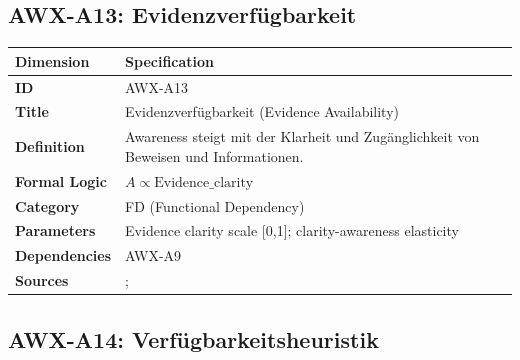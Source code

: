 
\subsection{AWX-A13: Evidenzverfügbarkeit}

\begin{table}[htbp]
\small
\begin{tabular}{p{3cm}p{11cm}}
\toprule
\textbf{Dimension} & \textbf{Specification} \\
\midrule
\textbf{ID} & AWX-A13 \\
\textbf{Title} & Evidenzverfügbarkeit (Evidence Availability) \\
\textbf{Definition} & Awareness steigt mit der Klarheit und Zugänglichkeit von Beweisen und Informationen. \\
\textbf{Formal Logic} & $A \propto \text{Evidence\_clarity}$ \\
\textbf{Category} & FD (Functional Dependency) \\
\textbf{Parameters} & Evidence clarity scale [0,1]; clarity-awareness elasticity \\
\textbf{Dependencies} & AWX-A9 \\
\textbf{Sources} & \citet{PAP-tversky1974judgment}; \citet{PAP-kahneman2003maps} \\
\bottomrule
\end{tabular}
\end{table}


\subsection{AWX-A14: Verfügbarkeitsheuristik}

